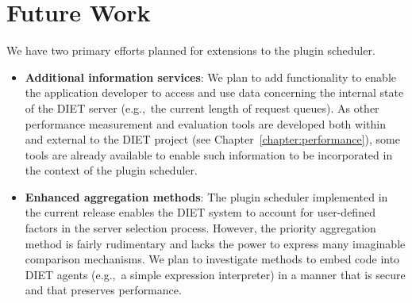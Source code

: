 \section{Future Work}

We have two primary efforts planned for extensions to the plugin
scheduler.
\begin{itemize}
\item \textbf{Additional information services}: We plan to add
  functionality to enable the application developer to access and use
  data concerning the internal state of the DIET server (e.g.,~the
  current length of request queues).  As other performance measurement
  and evaluation tools are developed both within and external to the
  DIET project (see Chapter~\ref{chapter:performance}), some
  tools are already available to enable such 
  information to be incorporated
  in the context of the plugin scheduler.
\item \textbf{Enhanced aggregation methods}: The plugin scheduler
  implemented in the current release enables the DIET system to
  account for user-defined factors in the server selection process.
  However, the priority aggregation method is fairly rudimentary and
  lacks the power to express many imaginable comparison mechanisms.
  We plan to investigate methods to embed code into DIET agents
  (e.g.,~a simple expression interpreter) in a manner that is secure
  and that preserves performance.
\end{itemize}


